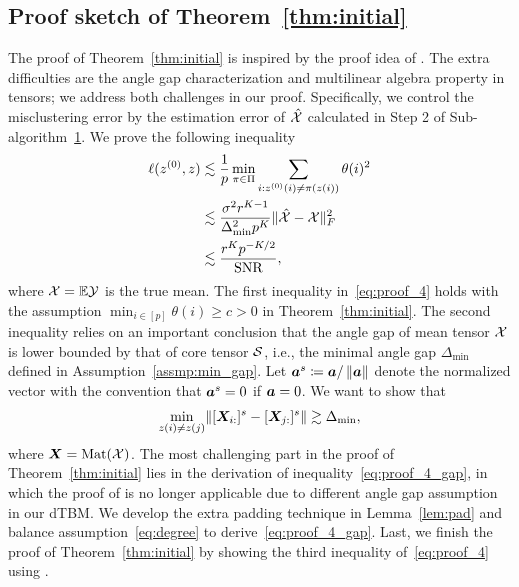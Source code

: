 \documentclass[journal]{IEEEtran}
\theoremstyle{definition}
\theoremstyle{definition}
\begin{document}
\subsection{Proof sketch of Theorem~\ref{thm:initial}}
The proof of Theorem~\ref{thm:initial} is inspired by the proof idea of \cite[Lemma 1]{gao2018community}. The extra difficulties are the angle gap characterization and multilinear algebra property in tensors; we address both challenges in our proof. Specifically, we control the misclustering error by the estimation error of $\hat {\mathcal{X}}$ calculated in Step 2 of Sub-algorithm~\hyperref[alg:main]{1}.  We prove the following inequality
\begin{align}
    \ell(z^{(0)},z) &\lesssim \frac{1}{p}\min_{\pi \in \Pi} \sum_{i: z^{(0)}(i) \neq \pi(z(i))} \theta(i)^2 \\
    &\lesssim \frac{\sigma^2 r^{K-1}}{ \Delta_{\min}^2 p^K} \onormSize{}{\hat \tX - \tX}_F^2 \\
    &\lesssim \frac{r^K p^{-K/2}}{\text{SNR}}, \label{eq:proof_4}
\end{align}
where $\mathcal{X} = \mathbb{E} \mathcal{Y}$ is the true mean. The first inequality in~\eqref{eq:proof_4} holds with the assumption $\min_{i \in [p]} \theta(i) \geq c>0$ in Theorem~\ref{thm:initial}. The second inequality relies on an important conclusion that the angle gap of mean tensor $\mathcal{X}$ is lower bounded by that of core tensor $\mathcal{S}$, i.e., the minimal angle gap $\Delta_{\min}$ defined in Assumption~\ref{assmp:min_gap}. Let $\bm{a}^{s} \coloneqq \bm{a}/\left\lVert\bm{a}\right\rVert$ denote the normalized vector with the convention that $\bm{a}^s = 0$ if $\bm{a} = 0$. We want to show that
\begin{equation}\label{eq:proof_4_gap}
\min_{z(i) \neq z(j)} \onormSize{}{[\mX_{i:}]^s - [\mX_{j:}]^s} \gtrsim \Delta_{\min},
\end{equation}
where $\bm X = \text{Mat}(\mathcal{X})$. The most challenging part in the proof of Theorem~\ref{thm:initial} lies in the derivation of inequality~\eqref{eq:proof_4_gap}, in which the proof of \cite{gao2018community} is no longer applicable due to different angle gap assumption in our dTBM. We develop the extra padding technique in Lemma~\ref{lem:pad} and balance assumption~\eqref{eq:degree} to derive~\eqref{eq:proof_4_gap}. Last, we finish the proof of Theorem~\ref{thm:initial} by showing the third inequality of~\eqref{eq:proof_4} using \cite[Proposition 1]{han2020exact}. 
\end{document}
